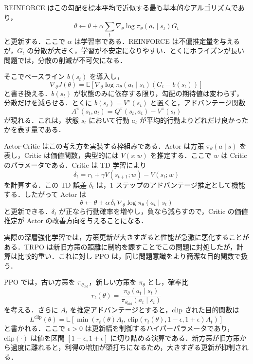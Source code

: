REINFORCE はこの勾配を標本平均で近似する最も基本的なアルゴリズムであり，
\begin{equation}
\theta \leftarrow \theta + \alpha \sum_t \nabla_\theta \log \pi_\theta(a_t \mid s_t) G_t
\end{equation}
と更新する．ここで $\alpha$ は学習率である．REINFORCE は不偏推定量を与えるが，$G_t$ の分散が大きく，学習が不安定になりやすい．とくにホライズンが長い問題では，分散の削減が不可欠になる．

そこでベースライン $b(s_t)$ を導入し，
\begin{equation}
\nabla_\theta J(\theta)
=
\mathbb{E}\left[
\nabla_\theta \log \pi_\theta(a_t \mid s_t)
\left(G_t - b(s_t)\right)
\right]
\end{equation}
と書き換える．$b(s_t)$ が状態のみに依存する限り，勾配の期待値は変わらず，分散だけを減らせる．とくに $b(s_t)=V^\pi(s_t)$ と置くと，アドバンテージ関数
\begin{equation}
A^\pi(s_t,a_t) = Q^\pi(s_t,a_t) - V^\pi(s_t)
\end{equation}
が現れる．これは，状態 $s_t$ において行動 $a_t$ が平均的行動よりどれだけ良かったかを表す量である．

Actor-Critic はこの考え方を実装する枠組みである．Actor は方策 $\pi_\theta(a \mid s)$ を表し，Critic は価値関数，典型的には $V(s;w)$ を推定する．ここで $w$ は Critic のパラメータである．Critic は TD 学習により
\begin{equation}
\delta_t = r_t + \gamma V(s_{t+1};w) - V(s_t;w)
\end{equation}
を計算する．この TD 誤差 $\delta_t$ は，1 ステップのアドバンテージ推定として機能する．したがって Actor は
\begin{equation}
\theta \leftarrow \theta + \alpha \, \delta_t \, \nabla_\theta \log \pi_\theta(a_t \mid s_t)
\end{equation}
と更新できる．$\delta_t$ が正なら行動確率を増やし，負なら減らすので，Critic の価値推定が Actor の改善方向を与えることになる．

実際の深層強化学習では，方策更新が大きすぎると性能が急激に悪化することがある．TRPO は新旧方策の距離に制約を課すことでこの問題に対処したが\cite{Schulman2015}，計算は比較的重い．これに対し PPO は，同じ問題意識をより簡潔な目的関数で扱う\cite{Schulman2017}．

PPO では，古い方策を $\pi_{\theta_{\mathrm{old}}}$，新しい方策を $\pi_\theta$ とし，確率比
\begin{equation}
r_t(\theta)
=
\frac{\pi_\theta(a_t \mid s_t)}{\pi_{\theta_{\mathrm{old}}}(a_t \mid s_t)}
\end{equation}
を考える．さらに $A_t$ を推定アドバンテージとすると，clip された目的関数は
\begin{equation}
L^{\mathrm{clip}}(\theta)
=
\mathbb{E}
\left[
\min\left(
r_t(\theta)A_t,\,
\mathrm{clip}\left(r_t(\theta),1-\epsilon,1+\epsilon\right)A_t
\right)
\right]
\end{equation}
と書かれる．ここで $\epsilon > 0$ は更新幅を制御するハイパーパラメータであり，$\mathrm{clip}(\cdot)$ は値を区間 $[1-\epsilon,1+\epsilon]$ に切り詰める演算である．新方策が旧方策から過度に離れると，利得の増加が頭打ちになるため，大きすぎる更新が抑制される．

